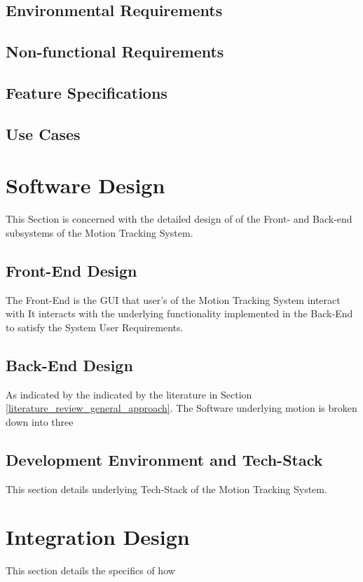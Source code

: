 \subsection{Environmental Requirements}


\subsection{Non-functional Requirements}


\subsection{Feature Specifications}


\subsection{Use Cases}


\section{Software Design}
This Section is concerned with the detailed design of of the Front- and Back-end
subsystems of the Motion Tracking System.

\subsection{Front-End Design}
The Front-End is the GUI that user's of the Motion Tracking System interact with 
It interacts with the underlying functionality implemented in the Back-End to
satisfy the System User Requirements. 

\subsection{Back-End Design}
As indicated by the indicated by the literature in Section
\ref{literature_review_general_approach}. The Software underlying motion is broken down into three

\subsection{Development Environment and Tech-Stack}
This section details underlying Tech-Stack of the Motion Tracking System.

\section{Integration Design}
This section details the specifics of how 





